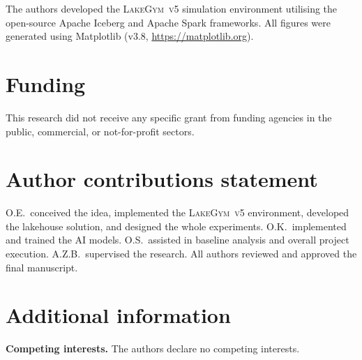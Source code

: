 \documentclass[fleqn,10pt]{wlscirep}
\newcommand{\env}{\textsc{LakeGym~v5}}
\begin{document}
The authors developed the \env{} simulation environment utilising the
open-source Apache Iceberg and Apache Spark frameworks.
All figures were generated using Matplotlib
(v3.8, \url{https://matplotlib.org}).


\section*{Funding}
This research did not receive any specific grant from funding agencies
in the public, commercial, or not-for-profit sectors.

\section*{Author contributions statement}

O.E.\ conceived the idea, implemented the \env{} environment,
developed the lakehouse solution, and    designed the whole experiments.
O.K.\ implemented and trained the AI models.
O.S.\ assisted in baseline analysis and overall project execution.
A.Z.B.\ supervised the research.
All authors reviewed and approved the final manuscript.

\section*{Additional information}

\textbf{Competing interests.} The authors declare no competing interests.
\end{document}
